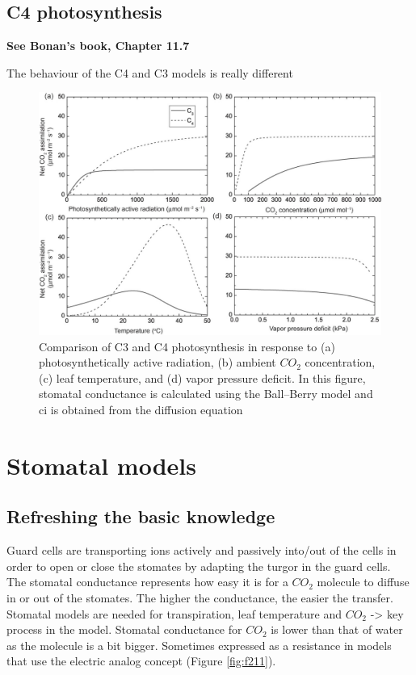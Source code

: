 \documentclass[
  12pt,
  oneside]{book}
\begin{document}
\hypertarget{c4-photosynthesis}{%
\subsection{C4 photosynthesis}\label{c4-photosynthesis}}

\textbf{See Bonan's book, Chapter 11.7}

The behaviour of the C4 and C3 models is really different

\begin{figure}

{\centering \includegraphics[width=0.8\linewidth]{figures/chap2/c3_c4} 

}

\caption{Comparison of C3 and C4 photosynthesis in response to (a) photosynthetically active radiation, (b) ambient $CO_2$ concentration, (c) leaf temperature, and (d) vapor pressure deficit. In this figure, stomatal conductance is calculated using the Ball–Berry model and ci is obtained from the diffusion equation}\label{fig:f210b}
\end{figure}

\hypertarget{stomatal-models}{%
\section{Stomatal models}\label{stomatal-models}}

\hypertarget{refreshing-the-basic-knowledge-1}{%
\subsection{Refreshing the basic knowledge}\label{refreshing-the-basic-knowledge-1}}

Guard cells are transporting ions actively and passively into/out of the cells in order to open or close the stomates by adapting the turgor in the guard cells.
The stomatal conductance represents how easy it is for a \(CO_2\) molecule to diffuse in or out of the stomates. The higher the conductance, the easier the transfer.
Stomatal models are needed for transpiration, leaf temperature and \(CO_2\) -\textgreater{} key process in the model. Stomatal conductance for \(CO_2\) is lower than that of water as the molecule is a bit bigger. Sometimes expressed as a resistance in models that use the electric analog concept (Figure \ref{fig:f211}).
\end{document}
